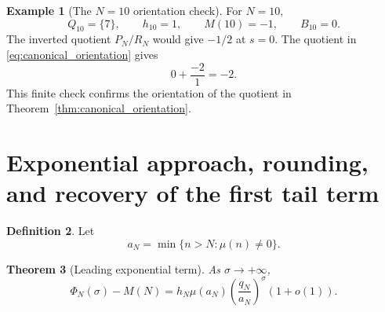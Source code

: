 \documentclass[11pt]{amsart}
\numberwithin{equation}{section}
\theoremstyle{plain}
\newtheorem{theorem}{Theorem}[section]
\theoremstyle{definition}
\newtheorem{definition}[theorem]{Definition}
\newtheorem{example}[theorem]{Example}
\theoremstyle{remark}
\newcommand{\1}{\mathbf{1}}
\begin{document}
\begin{example}[The \(N=10\) orientation check]
\label{exp:N10_orientation}
For \(N=10\),
\begin{equation}
Q_{10}=\{7\},
\qquad
h_{10}=1,
\qquad
M(10)=-1,
\qquad
B_{10}=0.
\label{eq:N10_data}
\end{equation}
The inverted quotient \(P_N/R_N\) would give \(-1/2\) at \(s=0\).
The quotient in \eqref{eq:canonical_orientation} gives
\begin{equation}
0+\frac{-2}{1}=-2.
\label{eq:N10_correct_value}
\end{equation}
This finite check confirms the orientation of the quotient in Theorem~\ref{thm:canonical_orientation}.
\end{example}

\section{Exponential approach, rounding, and recovery of the first tail term}
\label{sec:asymptotic_recovery}

\begin{definition}
\label{def:aN}
Let
\begin{equation}
a_N
=
\min\{n>N:\mu(n)\neq0\}.
\label{eq:aN_definition}
\end{equation}
\end{definition}

\begin{theorem}[Leading exponential term]
\label{thm:leading_exponential}
As \(\sigma\to+\infty\),
\begin{equation}
\boxed{
\Phi_N(\sigma)-M(N)
=
h_N\mu(a_N)
\left(\frac{q_N}{a_N}\right)^\sigma
\left(1+o(1)\right).
}
\label{eq:leading_exponential}
\end{equation}
\end{theorem}
\end{document}
